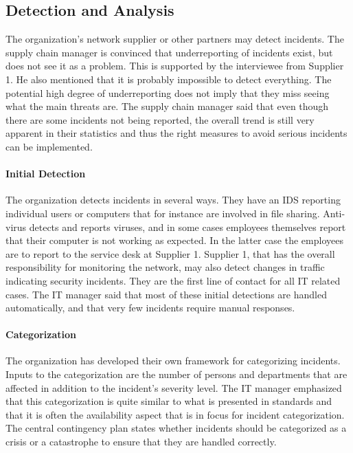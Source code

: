 \subsection{Detection and Analysis}
The organization's network supplier or other partners may detect incidents. The supply chain manager is convinced that underreporting of incidents exist, but does not see it as a problem. This is supported by the interviewee from Supplier 1. He also mentioned that it is probably impossible to detect everything. The potential high degree of underreporting does not imply that they miss seeing what the main threats are. The supply chain manager said that even though there are some incidents not being reported, the overall trend is still very apparent in their statistics and thus the right measures to avoid serious incidents can be implemented. 

\paragraph{Initial Detection}
The organization detects incidents in several ways. They have an \ac{IDS} reporting individual users or computers that for instance are involved in file sharing. Anti-virus detects and reports viruses, and in some cases employees themselves report that their computer is not working as expected. In the latter case the employees are to report to the service desk at Supplier 1. Supplier 1, that has the overall responsibility for monitoring the network, may also detect changes in traffic indicating security incidents. They are the first line of contact for all IT related cases. The IT manager said that most of these initial detections are handled automatically, and that very few incidents require manual responses. 

\paragraph{Categorization}
The organization has developed their own framework for categorizing incidents. Inputs to the categorization are the number of persons and departments that are affected in addition to the incident's severity level. The IT manager emphasized that this categorization is quite similar to what is presented in standards and that it is often the availability aspect that is in focus for incident categorization. The central contingency plan states whether incidents should be categorized as a crisis or a catastrophe to ensure that they are handled correctly.

